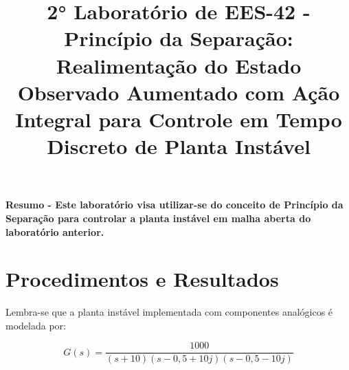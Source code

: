 \documentclass[9pt,conference]{IEEEtran}
\begin{document}
    
    \title{2° Laboratório de EES-42 - Princípio da Separação: Realimentação do Estado Observado Aumentado com 
Ação Integral para Controle em Tempo Discreto de Planta Instável}

    \author{
        
    }
    
    \maketitle
    
    
\textbf{Resumo - Este laboratório visa utilizar-se do conceito de Princípio da Separação para controlar a planta instável em malha aberta do laboratório anterior.
}




\section{Procedimentos e Resultados}

Lembra-se que a planta instável implementada com componentes analógicos é modelada por:

\begin{equation}
    G(s) = \frac{1000}{(s+10)(s-0,5+10j)(s-0,5-10j)}
\end{equation}
\end{document}
